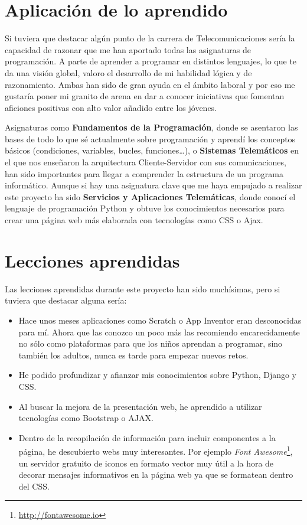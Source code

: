 \documentclass[a4paper, 12pt]{book}
\begin{document}
\section{Aplicación de lo aprendido}
\label{sec:aplicacion}
Si tuviera que destacar algún punto de la carrera de Telecomunicaciones sería la capacidad de razonar que me han aportado todas las asignaturas de programación. A parte de aprender a programar en distintos lenguajes, lo que te da una visión global, valoro el desarrollo de mi habilidad lógica y de razonamiento. Ambas han sido de gran ayuda en el ámbito laboral y por eso me gustaría poner mi granito de arena en dar a conocer iniciativas que fomentan aficiones positivas con alto valor añadido entre los jóvenes.  

Asignaturas como \textbf{Fundamentos de la Programación}, donde se asentaron las bases de todo lo que sé actualmente sobre programación y aprendí los conceptos básicos (condiciones, variables, bucles, funciones\ldots), o \textbf{Sistemas Telemáticos} en el que nos enseñaron la arquitectura Cliente-Servidor con sus comunicaciones, han sido importantes para llegar a comprender la estructura de un programa informático. Aunque si hay una asignatura clave que me haya empujado a realizar este proyecto ha sido \textbf{Servicios y Aplicaciones Telemáticas}, donde conocí el lenguaje de programación Python y obtuve los conocimientos necesarios para crear una página web más elaborada con tecnologías como CSS o Ajax. 

\section{Lecciones aprendidas}
\label{sec:lecciones_aprendidas}
Las lecciones aprendidas durante este proyecto han sido muchísimas, pero si tuviera que destacar alguna sería:
\begin{itemize}
  \item Hace unos meses aplicaciones como Scratch o App Inventor eran desconocidas para mí. Ahora que las conozco un poco más las recomiendo encarecidamente no sólo como plataformas para que los niños aprendan a programar, sino también los adultos, nunca es tarde para empezar nuevos retos.
  \item He podido profundizar y afianzar mis conocimientos sobre Python, Django y CSS.
  \item Al buscar la mejora de la presentación web, he aprendido a utilizar tecnologías como Bootstrap o AJAX.
  \item Dentro de la recopilación de información para incluir componentes a la página, he descubierto webs muy interesantes. Por ejemplo \textit{Font Awesome}\footnote{\url{http://fontawesome.io}}, un servidor gratuito de iconos en formato vector muy útil a la hora de decorar mensajes informativos en la página web ya que se formatean dentro del CSS. 
\end{itemize}
\end{document}
